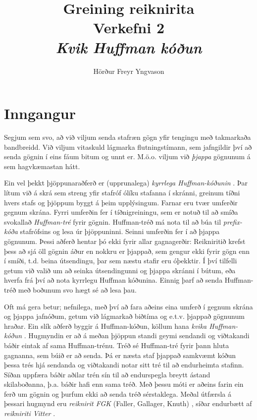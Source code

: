 \documentclass[a4paper,icelandic]{article}
\title{%
\textbf{Greining reiknirita}\\
Verkefni 2\\
\emph{Kvik Huffman kóðun}}
\author{Hörður Freyr Yngvason}
\theoremstyle{default}
\theoremstyle{definition}
\theoremstyle{remark}
\begin{document}
\maketitle

\section{Inngangur}
Segjum sem svo, að við viljum senda stafræn gögn yfir tengingu með
takmarkaða bandbreidd. Við viljum vitaskuld lágmarka flutningstímann,
sem jafngildir því að senda gögnin í eins fáum bitum og
unnt er. M.ö.o. viljum við \emph{þjappa} gögnunum á sem hagvkæmastan
hátt.

Ein vel þekkt þjöppunaraðferð er (upprunalega) \emph{kyrrlega
Huffman-kóðunin} \cite{mitAlgo}. Þar lítum við á skrá sem streng yfir
stafróf
ólíku stafanna í skránni, greinum tíðni hvers stafs og þjöppum
byggt á þeim upplýsingum. Farnar eru tvær umferðir
gegnum skrána. 
Fyrri umferðin fer í tíðnigreiningu, sem er notuð til að smíða svokallað
\emph{Huffman-tré} fyrir gögnin. Huffman-tréð má nota til að búa til
\emph{prefix-kóða} stafrófsins og lesa úr þjöppuninni.
Seinni umferðin fer í að þjappa gögnunum. 
Þessi aðferð hentar þó ekki fyrir allar gagnagerðir: Reikniritið krefst
þess að sjá öll gögnin áður en nokkru er þjappað, sem gengur ekki fyrir
gögn enn í smíði, t.d. beina útsendingu, þar sem næstu stafir eru
óþekktir. Í því tilfelli getum við valið um að seinka
útsendingunni og þjappa skránni í bútum, eða hverfa frá því að nota
kyrrlegu Huffman kóðunina. Einnig þarf að senda Huffman-tréð með boðunum
svo hægt sé að lesa þau.

Oft má gera betur; nefnilega, með því að fara aðeins eina umferð í
gegnum skrána og þjappa jafnóðum, getum við lágmarkað biðtíma og e.t.v.
þjappað gögnunum hraðar. Ein slík aðferð byggir á Huffman-kóðun, köllum
hana \emph{kvika Huffman-kóðun} \cite{vitter87}. Hugmyndin er að á meðan
þjöppun standi geymi sendandi og viðtakandi báðir eintak af sama
Huffman-trénu. Tréð sé Huffman-tré fyrir þann hluta gagnanna, sem búið
er að senda. Þá er næsta staf þjappað samkvæmt kóðun þessa trés hjá
sendanda og viðtakandi notar sitt tré til að endurheimta stafinn. Síðan
uppfæra báðir aðilar trén sín til að endurspegla breytt ástand
skilaboðanna, þ.a. báðir hafi enn sama tréð. Með þessu móti er aðeins
farin ein ferð um gögnin og þurfum ekki að senda tréð sérstaklega.
Meðal útfærsla á þessari hugmynd eru \emph{reiknirit FGK} (Faller,
Gallager, Knuth) \cite{knuth85}, síðar endurbætt af \emph{reikniriti
Vitter} \cite{vitter89}.
\end{document}
